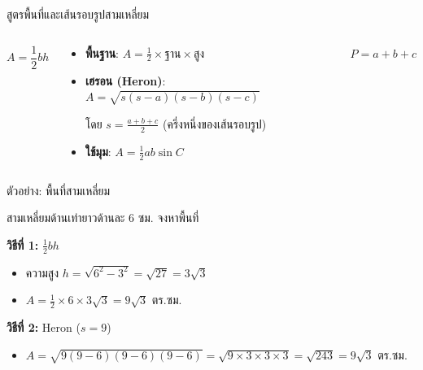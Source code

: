 \documentclass[11pt, aspectratio=169]{beamer}
\begin{document}
\begin{frame}{สูตรพื้นที่และเส้นรอบรูปสามเหลี่ยม}
  \begin{columns}[T]
      \centering
      \medskip\medskip\medskip\medskip
      \medskip\medskip\medskip\medskip
      \quad $A = \dfrac{1}{2}bh$

      \begin{explanation}[สูตรพื้นที่]
        \begin{itemize}
          \item \textbf{พื้นฐาน}: $A = \frac{1}{2} \times \text{ฐาน} \times \text{สูง}$
          \item \textbf{เฮรอน (Heron)}: $A = \sqrt{s(s-a)(s-b)(s-c)}$
          \par \quad โดย $s = \frac{a+b+c}{2}$ (ครึ่งหนึ่งของเส้นรอบรูป)
          \item \textbf{ใช้มุม}: $A = \frac{1}{2}ab\sin C$
        \end{itemize}
      \end{explanation}

      \begin{exambox}[เส้นรอบรูป]
        $P = a + b + c$
      \end{exambox}
  \end{columns}
\end{frame}

\begin{frame}{ตัวอย่าง: พื้นที่สามเหลี่ยม}
  \begin{exambox}[โจทย์]
    สามเหลี่ยมด้านเท่ายาวด้านละ 6 ซม. จงหาพื้นที่
  \end{exambox}

  \begin{solbox}[วิธีทำ]
    \textbf{วิธีที่ 1:} $\frac{1}{2}bh$
    \begin{itemize}
      \item ความสูง $h = \sqrt{6^2 - 3^2} = \sqrt{27} = 3\sqrt{3}$
      \item $A = \frac{1}{2} \times 6 \times 3\sqrt{3} = 9\sqrt{3}$ ตร.ซม.
    \end{itemize}

    \medskip
    \textbf{วิธีที่ 2:} Heron ($s = 9$)
    \begin{itemize}
      \item $A = \sqrt{9(9-6)(9-6)(9-6)} = \sqrt{9 \times 3 \times 3 \times 3} = \sqrt{243} = 9\sqrt{3}$ ตร.ซม.
    \end{itemize}
  \end{solbox}
\end{frame}
\end{document}
